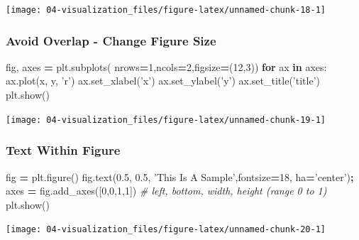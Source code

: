 \documentclass[
]{book}
\newenvironment{Shaded}{\begin{snugshade}}{\end{snugshade}}
\newcommand{\CommentTok}[1]{\textcolor[rgb]{0.37,0.37,0.37}{\textit{#1}}}
\newcommand{\ControlFlowTok}[1]{\textcolor[rgb]{0.27,0.27,0.27}{\textbf{#1}}}
\newcommand{\DecValTok}[1]{\textcolor[rgb]{0.06,0.06,0.06}{#1}}
\newcommand{\FloatTok}[1]{\textcolor[rgb]{0.06,0.06,0.06}{#1}}
\newcommand{\KeywordTok}[1]{\textcolor[rgb]{0.27,0.27,0.27}{\textbf{#1}}}
\newcommand{\NormalTok}[1]{#1}
\newcommand{\OperatorTok}[1]{\textcolor[rgb]{0.43,0.43,0.43}{\textbf{#1}}}
\newcommand{\StringTok}[1]{\textcolor[rgb]{0.5,0.5,0.5}{#1}}
\begin{document}
\texttt{[image: 04-visualization\_files/figure-latex/unnamed-chunk-18-1]}

\hypertarget{avoid-overlap---change-figure-size}{%
\subsubsection{Avoid Overlap - Change Figure Size}\label{avoid-overlap---change-figure-size}}

\begin{Shaded}
\begin{Highlighting}[]
\NormalTok{fig, axes }\OperatorTok{=}\NormalTok{ plt.subplots( nrows}\OperatorTok{=}\DecValTok{1}\NormalTok{,ncols}\OperatorTok{=}\DecValTok{2}\NormalTok{,figsize}\OperatorTok{=}\NormalTok{(}\DecValTok{12}\NormalTok{,}\DecValTok{3}\NormalTok{))}
\ControlFlowTok{for}\NormalTok{ ax }\KeywordTok{in}\NormalTok{ axes:}
\NormalTok{    ax.plot(x, y, }\StringTok{'r'}\NormalTok{)}
\NormalTok{    ax.set_xlabel(}\StringTok{'x'}\NormalTok{)}
\NormalTok{    ax.set_ylabel(}\StringTok{'y'}\NormalTok{)}
\NormalTok{    ax.set_title(}\StringTok{'title'}\NormalTok{)}
\NormalTok{plt.show()}
\end{Highlighting}
\end{Shaded}

\texttt{[image: 04-visualization\_files/figure-latex/unnamed-chunk-19-1]}

\hypertarget{text-within-figure}{%
\subsubsection{Text Within Figure}\label{text-within-figure}}

\begin{Shaded}
\begin{Highlighting}[]
\NormalTok{fig }\OperatorTok{=}\NormalTok{ plt.figure()}
\NormalTok{fig.text(}\FloatTok{0.5}\NormalTok{, }\FloatTok{0.5}\NormalTok{, }\StringTok{'This Is A Sample'}\NormalTok{,fontsize}\OperatorTok{=}\DecValTok{18}\NormalTok{, ha}\OperatorTok{=}\StringTok{'center'}\NormalTok{)}\OperatorTok{;}
\NormalTok{axes }\OperatorTok{=}\NormalTok{ fig.add_axes([}\DecValTok{0}\NormalTok{,}\DecValTok{0}\NormalTok{,}\DecValTok{1}\NormalTok{,}\DecValTok{1}\NormalTok{]) }\CommentTok{# left, bottom, width, height (range 0 to 1)}
\NormalTok{plt.show()}
\end{Highlighting}
\end{Shaded}

\texttt{[image: 04-visualization\_files/figure-latex/unnamed-chunk-20-1]}
\end{document}
